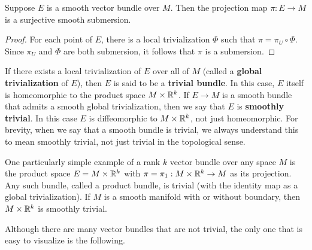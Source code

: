 \begin{proposition}
Suppose $E$ is a smooth vector bundle over $M$. Then the projection map $\pi:E\to M$ is a surjective smooth submersion.
\end{proposition}
\begin{proof}
For each point of $E$, there is a local trivialization $\varPhi$ such that $\pi=\pi_U\circ\varPhi$. Since $\pi_U$ and $\varPhi$ are both submersion, it follows that $\pi$ is a submersion.
\end{proof}
If there exists a local trivialization of $E$ over all of $M$ (called a \textbf{global trivialization} of $E$), then $E$ is said to be a \textbf{trivial bundle}. In this case, $E$ itself is homeomorphic to the product space $M\times\mathbb{R}^k$. If $E\to M$ is a smooth bundle that admits a smooth global trivialization, then we say that $E$ is \textbf{smoothly trivial}. In this case $E$ is diffeomorphic to $M\times\mathbb{R}^k$, not just homeomorphic. For brevity, when we say that a smooth bundle is trivial, we always understand this to mean smoothly trivial, not just trivial in the topological sense.
\begin{example}
One particularly simple example of a rank $k$ vector bundle over any space $M$ is the product space $E=M\times\mathbb{R}^k$ with $\pi=\pi_1:M\times\mathbb{R}^k\to M$ as its projection. Any such bundle, called a product bundle, is trivial (with the identity map as a global trivialization). If $M$ is a smooth manifold with or without boundary, then $M\times\mathbb{R}^k$ is smoothly trivial.
\end{example}
Although there are many vector bundles that are not trivial, the only one that is easy to visualize is the following.
